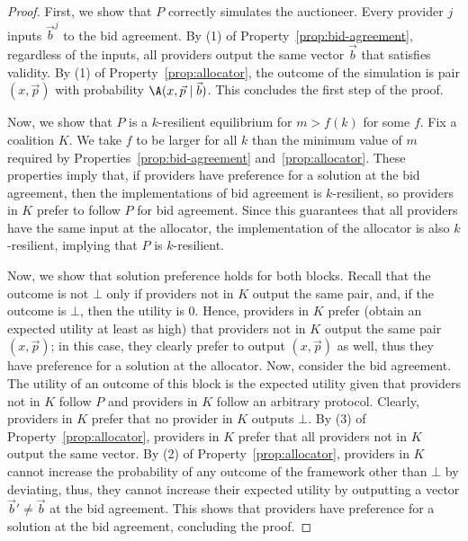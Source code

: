 \begin{proof}
\label{app:simulation}
First, we show that $P$ correctly simulates the auctioneer.
Every provider $j$ inputs $\vec{b}^j$ to the bid agreement.
By (1) of Property~\ref{prop:bid-agreement}, regardless of the inputs,
all providers output the same vector $\vec{b}$
that satisfies validity. By (1) of Property~\ref{prop:allocator},
the outcome of the simulation is pair $(x,\vec{p})$
with probability $\A(x,\vec{p} \mid \vec{b})$.
This concludes the first step of the proof.

Now, we show that $P$ is a $k$-resilient equilibrium for $m > f(k)$ for some $f$.
Fix a coalition $K$. We take $f$ to be larger for all $k$ than the minimum value of $m$
required by Properties~\ref{prop:bid-agreement} and~\ref{prop:allocator}.
These properties imply that, if providers have preference for a solution
at the bid agreement, then the implementations of bid agreement is $k$-resilient,
so providers in $K$ prefer to follow $P$ for bid agreement.
Since this guarantees that all providers have the same input at the
allocator, the implementation of the allocator is also $k$-resilient,
implying that $P$ is $k$-resilient.

Now, we show that solution preference holds for both blocks.
Recall that the outcome is not $\bot$ only if
providers not in $K$ output the same pair,
and, if the outcome is $\bot$, then the utility is $0$.
Hence, providers in $K$ prefer (obtain an expected utility at least as high)
that providers not in $K$ output the same pair $(x,\vec{p})$;
in this case, they clearly prefer to output $(x,\vec{p})$ as well, thus they have preference
for a solution at the allocator. Now, consider the bid agreement.
The utility of an outcome of this block is the expected
utility given that providers not in $K$ follow $P$ and providers in $K$
follow an arbitrary protocol. Clearly, providers in $K$
prefer that no provider in $K$ outputs $\bot$.
By (3) of Property~\ref{prop:allocator}, providers in $K$
prefer that all providers not in $K$ output the same vector.
By (2) of Property~\ref{prop:allocator},
providers in $K$ cannot increase the probability of any outcome of the framework 
other than $\bot$ by deviating, thus, they cannot increase their expected utility by outputting
a vector $\vec{b}' \neq \vec{b}$ at the bid agreement.
This shows that providers have preference for a 
solution at the bid agreement, concluding the proof.
\end{proof}

